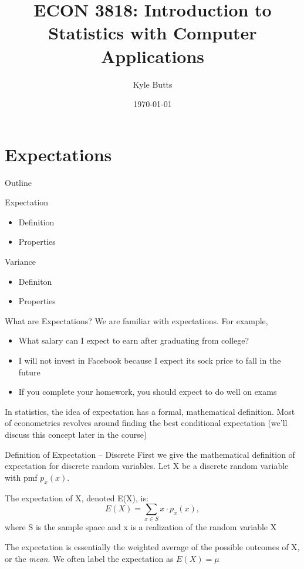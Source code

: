 \documentclass{beamer}
\title{ECON 3818: Introduction to Statistics with Computer Applications}
\date{\today}
\author{Kyle Butts}
\begin{document}
\maketitle

\section{Expectations}

\begin{frame}{Outline}
	
	\alert{Expectation}
	\begin{itemize}
		\item Definition
		\item Properties
	\end{itemize}
		
	\alert{Variance}
	\begin{itemize}
		\item Definiton
		\item Properties
		      
	\end{itemize}
	
\end{frame}

\begin{frame}{What are Expectations?}
	We are familiar with expectations. For example, 
	\begin{itemize}
		\item What salary can I expect to earn after graduating from college?
		\item I will not invest in Facebook because I expect its sock price to fall in the future
		\item If you complete your homework, you should expect to do well on exams 
	\end{itemize}
	In statistics, the idea of expectation has a formal, mathematical definition. Most of econometrics revolves around finding the best \alert{conditional expectation} (we'll discuss this concept later in the course)
\end{frame}

\begin{frame}{Definition of Expectation -- Discrete}
	First we give the mathematical definition of \alert{expectation} for discrete random variables.
	Let X be a discrete random variable with pmf $p_x(x)$. 
	
	\begin{definition}\vspace{2.5mm}
		The \alert{expectation} of X, denoted E(X), is: \[ 
			E(X)= \sum_{x \in S} x\cdot p_x(x), 
		\]
		where S is the sample space and x is a realization of the random variable X

	\end{definition}
		
	The expectation is essentially the weighted average of the possible outcomes of X, or the \textit{mean}. We often label the expectation as $E(X) = \mu$
\end{frame} 
\end{document}
